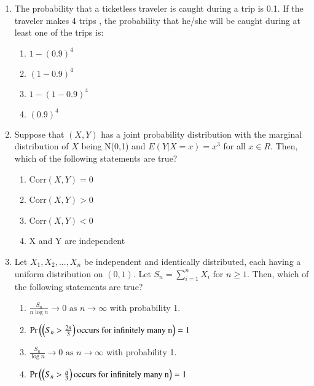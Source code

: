 \renewcommand{\theequation}{\theenumi}
\renewcommand{\thefigure}{\theenumi}
\begin{enumerate}[label=\thesection.\arabic*.,ref=\thesection.\theenumi]

\item The probability that a ticketless traveler is caught during a trip is 0.1. If the traveler makes 4 trips , the probability that he/she will be caught during at least one of the trips is:\\
\begin{enumerate}
    \item $1-(0.9)^4$
    \item $(1-0.9)^4$
    \item $1-(1-0.9)^4$
    \item $(0.9)^4$
\end{enumerate}
\solution


\item Suppose that $(X,Y)$ has a joint probability distribution with the marginal distribution of $X$ being N(0,1) and $E(Y|X=x)=x^3$ for all $x \in R$. Then, which of the following statements are true?
\begin{enumerate}
    \item Corr$(X,Y) = 0$
    \item Corr$(X,Y) > 0$
    \item Corr$(X,Y) < 0$
    \item X and Y are independent
\end{enumerate}
\solution

%
 \item Let $X_1,X_2,...,X_n$ be independent and identically distributed, each having a uniform distribution on $(0,1)$. Let $S_n=\sum_{i=1}^{n}X_i$ for $n\ge 1$. Then, which of the following statements are true? 
\begin{enumerate}[label=\Alph*)]
\item $\frac{S_n}{n \log{n}}\to 0 \text{ as } n \to \infty$ with probability 1.
\item $\Pr\left(\left(S_n>\frac{2n}{3}\right)\text{occurs for infinitely many n}\right)=1$
\item $\frac{S_n}{\log{n}}\to 0\text{ as } n \to \infty$ with probability 1.
\item $\Pr\left(\left(S_n>\frac{n}{3}\right)\text{occurs for infinitely many n}\right)=1$
\end{enumerate}
%
\solution

%

\end{enumerate}
